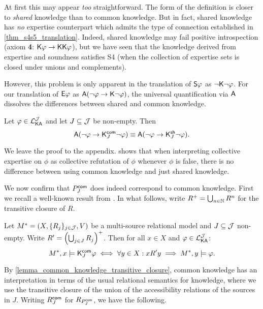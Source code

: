 At first this may appear \emph{too} straightforward. The form of the definition
is closer to \emph{shared} knowledge than to common knowledge. But in fact,
shared knowledge has \emph{no} expertise counterpart which admits the type of
connection established in \cref{thm_s4s5_translation}. Indeed, shared knowledge
may fail positive introspection (axiom \textbf{4}: $\K\phi \limplies
\K\K\phi$), but we have seen that the knowledge derived from expertise and
soundness satisfies S4 (when the collection of expertise sets is closed under
unions and complements).

However, this problem is only apparent in the translation of $\S\phi$ as
$\neg\K\neg\phi$. For our translation of $\E\phi$ as $\A(\neg\phi \limplies
\K\neg\phi)$, the universal quantification via $\A$ dissolves the differences
between shared and common knowledge.

\begin{proposition}
\label{prop_shared_common_collapse}
Let $\phi \in \cLKAJ$ and let $J \subseteq \J$ be non-empty.
Then
\[
\A(\neg\phi \limplies \Kcommon_J\neg\phi)
\equiv
\A(\neg\phi \limplies \Kshared_J\neg\phi).\]
\end{proposition}

We leave the proof to the appendix.
%
 shows that when interpreting collective
expertise on $\phi$ as collective refutation of $\phi$ whenever
$\phi$ is false, there is no difference between using common knowledge
and just shared knowledge.

We now confirm that $\Pcommon_J$ does indeed correspond to common
knowledge. First we recall a well-known result from \citet{fagin2003reasoning}.
In what follows, write $R^\trcls = \bigcup_{n \in \N}{R^n}$ for the transitive
closure of $R$.

\begin{lemma}
\label{lemma_common_knowledge_transitive_closure}
Let $M^* = (X, \{R_j\}_{j \in \J}, V)$ be a multi-source relational
model and $J \subseteq \J$ non-empty. Write $R' =
\left(\bigcup_{j \in J}{R_j}\right)^\trcls$. Then for all $x \in X$
and $\phi \in \cLKAJ$:
\[
M^*, x \models \Kcommon_J\phi
\iff
\forall y \in X: x{R'}y \implies M^*, y \models \phi.\]
\end{lemma}

By \cref{lemma_common_knowledge_transitive_closure}, common knowledge has an
interpretation in terms of the usual relational semantics for knowledge, where
we use the transitive closure of the union of the accessibility relations of
the sources in $J$.
%
Writing $\Rcommon_J$ for $R_{\Pcommon_J}$, we have the following.

